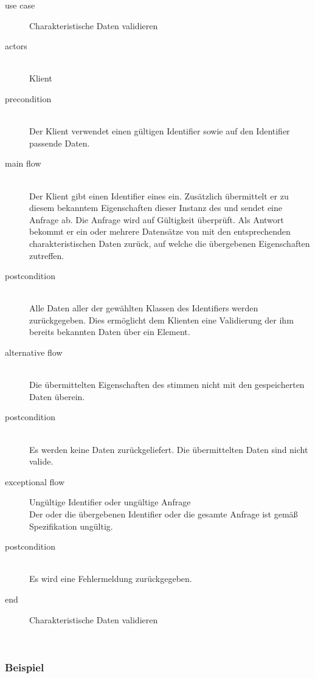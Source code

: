 {\small

\begin{description}
     \item[use case] Charakteristische Daten validieren
     \item[  actors]~\\
     Klient
     \item[  precondition]~\\
     Der Klient verwendet einen gültigen Identifier sowie auf den Identifier passende Daten.
     \item[  main flow]~\\
     Der Klient gibt einen Identifier eines  ein. Zusätzlich übermittelt er zu diesem bekanntem  Eigenschaften dieser Instanz des  und sendet eine Anfrage ab. Die Anfrage wird auf Gültigkeit überprüft. Als Antwort bekommt er ein oder mehrere Datensätze von  mit den entsprechenden charakteristischen Daten zurück, auf welche die übergebenen Eigenschaften zutreffen. 
     \item[  postcondition]~\\
     Alle Daten aller  der gewählten Klassen des Identifiers werden zurückgegeben. Dies ermöglicht dem Klienten eine Validierung der ihm bereits bekannten Daten über ein Element.
      \item[  alternative flow]~\\
     Die übermittelten Eigenschaften des  stimmen nicht mit den gespeicherten Daten überein.
      \item[  postcondition]~\\
     Es werden keine Daten zurückgeliefert. Die übermittelten Daten sind nicht valide. 
      \item[  exceptional flow] Ungültige Identifier oder ungültige Anfrage ~\\
     Der oder die übergebenen Identifier oder die gesamte Anfrage ist gemäß Spezifikation ungültig.   
     \item[  postcondition]~\\
     Es wird eine Fehlermeldung zurückgegeben.   
     \item[end] Charakteristische Daten validieren
\end{description}

~\\

} %

\subsubsection{Beispiel}

